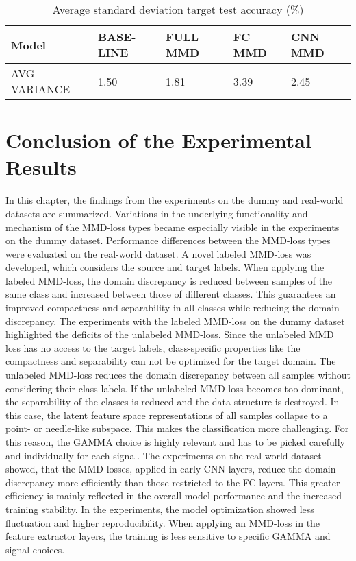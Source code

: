 \begin {table}[H]
\centering
\begin{tabular}{lllll}
  \toprule
  Model & BASE-LINE & FULL MMD & FC MMD & CNN MMD\\
  \midrule
  AVG VARIANCE & 1.50 & 1.81 & 3.39 & 2.45\\
  \bottomrule
\end{tabular}
\caption {Average standard deviation target test accuracy (\%)} \label{tab:Average_Variance_Accuracy} 
\end {table}

\section{Conclusion of the Experimental Results}\label{ch:Performance_overview}
In this chapter, the findings from the experiments on the dummy and real-world datasets are summarized. Variations in the underlying functionality and mechanism of the MMD-loss types became especially visible in the experiments on the dummy dataset. Performance differences between the MMD-loss types were evaluated on the real-world dataset. A novel labeled MMD-loss was developed, which considers the source and target labels. When applying the labeled MMD-loss, the domain discrepancy is reduced between samples of the same class and increased between those of different classes. This guarantees an improved compactness and separability in all classes while reducing the domain discrepancy. The experiments with the labeled MMD-loss on the dummy dataset highlighted the deficits of the unlabeled MMD-loss. Since the unlabeled MMD loss has no access to the target labels, class-specific properties like the compactness and separability can not be optimized for the target domain. The unlabeled MMD-loss reduces the domain discrepancy between all samples without considering their class labels. If the unlabeled MMD-loss becomes too dominant, the separability of the classes is reduced and the data structure is destroyed. In this case, the latent feature space representations of all samples collapse to a point- or needle-like subspace. This makes the classification more challenging. For this reason, the GAMMA choice is highly relevant and has to be picked carefully and individually for each signal. The experiments on the real-world dataset showed, that the MMD-losses, applied in early CNN layers, reduce the domain discrepancy more efficiently than those restricted to the FC layers. This greater efficiency is mainly reflected in the overall model performance and the increased training stability. In the experiments, the model optimization showed less fluctuation and higher reproducibility. When applying an MMD-loss in the feature extractor layers, the training is less sensitive to specific GAMMA and signal choices. 